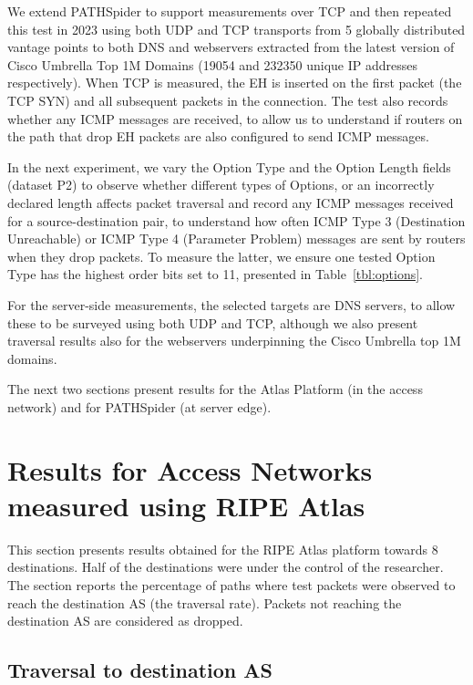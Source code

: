 \documentclass[conference]{IEEEtran}
\begin{document}
We extend PATHSpider to support measurements over TCP and then repeated this test in 2023 using both UDP and TCP transports from 5 globally distributed vantage points to both DNS and webservers extracted from the latest version of Cisco Umbrella Top 1M Domains (19054 and 232350 unique IP addresses respectively). When TCP is measured, the EH is inserted on the first packet (the TCP SYN) and all subsequent packets in the connection.
The test also records whether any ICMP messages are received, to allow us to understand if routers on the path that drop EH packets are also configured to send ICMP messages.

In the next experiment, we vary the Option Type and the Option Length fields (dataset P2) to observe whether different types of Options, or an incorrectly declared length affects packet traversal and record any ICMP messages received
for a source-destination pair, to understand how often ICMP Type 3 (Destination Unreachable) or ICMP Type 4 (Parameter Problem) messages are sent by routers when they drop packets. To measure the latter, we ensure one tested Option Type has the highest order bits set to 11, presented in Table~\ref{tbl:options}.

For the server-side measurements, the selected targets are DNS servers, to allow these to be surveyed using both UDP and TCP, although we also present traversal results also for the webservers underpinning the Cisco Umbrella top 1M domains.

The next two sections present results for the Atlas Platform  (in the access network) and for PATHSpider (at server edge).

\section{Results for Access Networks measured using RIPE Atlas} 
\label{sec:ripe-results}

This section presents results obtained for the RIPE Atlas platform towards 8 destinations. Half of the destinations were under the control of the researcher. The section reports the percentage of paths where test packets were observed to reach the destination AS (the traversal rate). Packets not reaching the destination AS are considered as dropped. 

\subsection{Traversal to destination AS}
\end{document}
